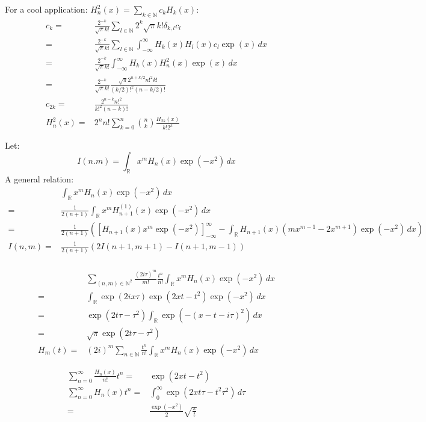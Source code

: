 \newpage
For a cool application: $H_n^2(x) = \sum_{k\in\mathbb{N}}c_kH_k(x)$:
\begin{equation*}
\begin{aligned}
	c_k=&\frac{2^{-k}}{\sqrt{\pi}k!}\sum_{l\in\mathbb{N}}2^k\sqrt{\pi}k!\delta_{k,l}c_l\\
	=&\frac{2^{-k}}{\sqrt{\pi}k!}\sum_{l\in\mathbb{N}}\int_{-\infty}^{\infty}H_k(x)H_l(x)c_l\exp(x)\,dx\\
	=&\frac{2^{-k}}{\sqrt{\pi}k!}\int_{-\infty}^{\infty}H_k(x)H_n^2(x)\exp(x)\,dx\\
	=&\frac{2^{-k}}{\sqrt{\pi}k!}\frac{\sqrt{\pi}2^{n+k/2}n!^2k!}{(k/2)!^2(n-k/2)!}\\
	c_{2k}=&\frac{2^{n-k}n!^2}{k!^2(n-k)!}\\
	H_n^2(x)=&2^nn!\sum_{k=0}^{n}\binom{n}{k}\frac{H_{2k}(x)}{k!2^k}
\end{aligned}
\end{equation*}

\newpage
Let:
\[I(n.m) = \int_{\mathbb{R}}x^mH_n(x)\exp(-x^2)\,dx\]
A general relation:
\begin{equation*}
\begin{aligned}
	&\int_{\mathbb{R}}x^mH_n(x)\exp(-x^2)\,dx\\
	=&\frac{1}{2(n+1)}\int_{\mathbb{R}}x^mH_{n+1}^{(1)}(x)\exp(-x^2)\,dx\\
	=&\frac{1}{2(n+1)}\left(\left[H_{n+1}(x)x^m\exp(-x^2)\right]^{\infty}_{-\infty}-\int_{\mathbb{R}}H_{n+1}(x)(mx^{m-1}-2x^{m+1})\exp(-x^2)\,dx\right)\\
	I(n,m)=&\frac{1}{2(n+1)}\left(2I(n+1,m+1)-I(n+1,m-1)\right)\\
\end{aligned}
\end{equation*}

\begin{equation*}
\begin{aligned}
	&\sum_{(n,m)\in\mathbb{N}^2}\frac{(2i\tau)^m}{m!}\frac{t^n}{n!}\int_{\mathbb{R}}x^mH_n(x)\exp(-x^2)\,dx\\
	=&\int_{\mathbb{R}}\exp(2ix\tau)\exp(2xt-t^2)\exp(-x^2)\,dx\\
	=&\exp(2t\tau-\tau^2)\int_{\mathbb{R}}\exp(-(x-t-i\tau)^2)\,dx\\
	=&\sqrt{\pi}\exp(2t\tau-\tau^2)\\
	H_m(t)=&(2i)^m\sum_{n\in\mathbb{N}}\frac{t^n}{n!}\int_{\mathbb{R}}x^mH_n(x)\exp(-x^2)\,dx
\end{aligned}
\end{equation*}

\newpage
\begin{equation*}
\begin{aligned}
	\sum_{n=0}^{\infty}\frac{H_n(x)}{n!}t^n =& \exp(2xt-t^2) \\
	\sum_{n=0}^{\infty}H_n(x)t^n =&\int_{0}^{\infty} \exp(2xt\tau-t^2\tau^2)\,d\tau \\
	=&\frac{\exp(-x^2)}{2}\sqrt{\frac{\pi}{t}}\\
\end{aligned}
\end{equation*}

